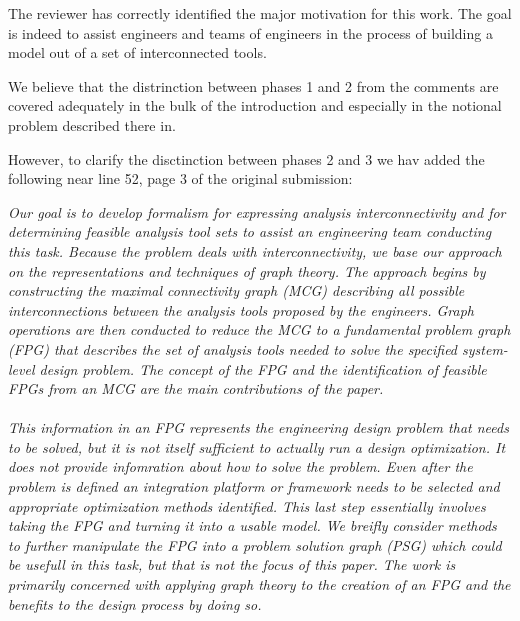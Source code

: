 \documentclass{aiaa-tc}
\begin{document}
The reviewer has correctly identified the major motivation for this work. The goal is indeed to 
assist engineers and teams of engineers in the process of building a model out of a set of interconnected 
tools. 

We believe that the distrinction between phases 1 and 2 from the comments are covered adequately 
in the bulk of the introduction and especially in the notional problem described there in. 

However, to clarify the disctinction between phases 2 and 3 we hav added the following near 
line 52, page 3 of the original submission: 

\emph{%
Our goal is to develop formalism for expressing analysis interconnectivity and for determining feasible
    analysis tool sets to assist an engineering team conducting this task. Because the problem deals with
    interconnectivity, we base our approach on the representations and techniques of graph theory.
    The approach begins by constructing the \emph{maximal connectivity graph (MCG)} describing all possible
    interconnections between the analysis tools proposed by the engineers. Graph operations are then
    conducted to reduce the MCG to a \emph{fundamental problem graph (FPG)} that describes the set of analysis
    tools needed to solve the specified system-level design problem. The concept of the FPG and 
    the identification of feasible FPGs from an MCG are the main contributions of the paper. \\\\
    This information in an FPG represents the engineering design problem that needs to be solved, but it is not 
    itself sufficient to actually run a design optimization. It does not provide infomration 
    about how to solve the problem. Even after the problem is defined an integration platform or framework needs 
    to be selected and appropriate optimization methods identified. This last step essentially 
    involves taking the FPG and turning it into a usable model. We breifly consider methods to further 
    manipulate the FPG into a \emph{problem solution graph (PSG)} which could be usefull in this 
    task, but that is not the focus of this paper. The work is primarily concerned with applying graph 
    theory to the creation of an FPG and the benefits to the design process by doing so.}
\end{document}

